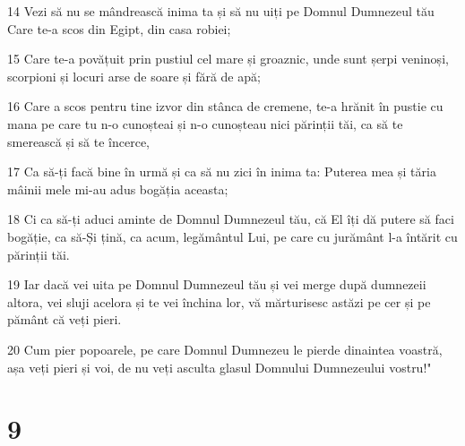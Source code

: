 \par 14 Vezi să nu se mândrească inima ta și să nu uiți pe Domnul Dumnezeul tău Care te-a scos din Egipt, din casa robiei;
\par 15 Care te-a povățuit prin pustiul cel mare și groaznic, unde sunt șerpi veninoși, scorpioni și locuri arse de soare și fără de apă;
\par 16 Care a scos pentru tine izvor din stânca de cremene, te-a hrănit în pustie cu mana pe care tu n-o cunoșteai și n-o cunoșteau nici părinții tăi, ca să te smerească și să te încerce,
\par 17 Ca să-ți facă bine în urmă și ca să nu zici în inima ta: Puterea mea și tăria mâinii mele mi-au adus bogăția aceasta;
\par 18 Ci ca să-ți aduci aminte de Domnul Dumnezeul tău, că El îți dă putere să faci bogăție, ca să-Și țină, ca acum, legământul Lui, pe care cu jurământ l-a întărit cu părinții tăi.
\par 19 Iar dacă vei uita pe Domnul Dumnezeul tău și vei merge după dumnezeii altora, vei sluji acelora și te vei închina lor, vă mărturisesc astăzi pe cer și pe pământ că veți pieri.
\par 20 Cum pier popoarele, pe care Domnul Dumnezeu le pierde dinaintea voastră, așa veți pieri și voi, de nu veți asculta glasul Domnului Dumnezeului vostru!"

\chapter{9}

